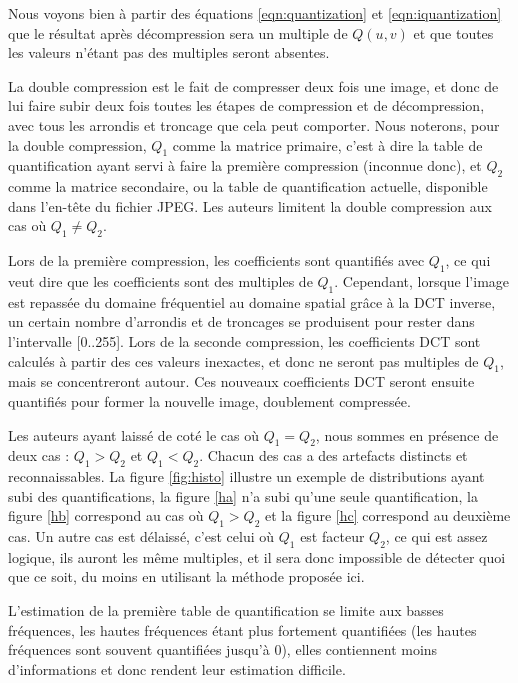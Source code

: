 \documentclass[utf8,final]{stageM2R} %
\begin{document}
Nous voyons bien à partir des équations \ref{eqn:quantization} et \ref{eqn:iquantization} que le résultat après décompression sera un multiple de $Q(u,v)$ et que toutes les valeurs n'étant pas des multiples seront absentes.

La double compression est le fait de compresser deux fois une image, et donc de lui faire subir deux fois toutes les étapes de compression et de décompression, avec tous les arrondis et troncage que cela peut comporter. Nous noterons, pour la double compression, $Q_{1}$ comme la matrice primaire, c'est à dire la table de quantification ayant servi à faire la première compression (inconnue donc), et $Q_{2}$ comme la matrice secondaire, ou la table de quantification actuelle, disponible dans l'en-tête du fichier JPEG. Les auteurs limitent la double compression aux cas où $Q_{1} \neq Q_{2}$.

Lors de la première compression, les coefficients sont quantifiés avec $Q_{1}$, ce qui veut dire que les coefficients sont des multiples de $Q_{1}$. Cependant, lorsque l'image est repassée du domaine fréquentiel au domaine spatial grâce à la DCT inverse, un certain nombre d'arrondis et de troncages se produisent pour rester dans l'intervalle [0..255]. Lors de la seconde compression, les coefficients DCT sont calculés à partir des ces valeurs inexactes, et donc ne seront pas multiples de $Q_{1}$, mais se concentreront autour. Ces nouveaux coefficients DCT seront ensuite quantifiés pour former la nouvelle image, doublement compressée.

Les auteurs ayant laissé de coté le cas où $Q_{1} = Q_{2}$, nous sommes en présence de deux cas : $Q_{1} > Q_{2}$ et $Q_{1} < Q_{2}$. Chacun des cas a des artefacts distincts et reconnaissables. La figure \ref{fig:histo} illustre un exemple de distributions ayant subi des quantifications, la figure \ref{ha} n'a subi qu'une seule quantification, la figure \ref{hb} correspond au cas où $Q_{1} > Q_{2}$ et la figure \ref{hc} correspond au deuxième cas. Un autre cas est délaissé, c'est celui où $Q_{1}$ est facteur $Q_{2}$, ce qui est assez logique, ils auront les même multiples, et il sera donc impossible de détecter quoi que ce soit, du moins en utilisant la méthode proposée ici.

L'estimation de la première table de quantification se limite aux basses fréquences, les hautes fréquences étant plus fortement quantifiées (les hautes fréquences sont souvent quantifiées jusqu'à 0), elles contiennent moins d'informations et donc rendent leur estimation difficile.
\end{document}
